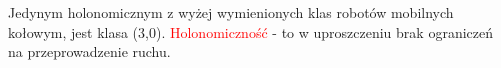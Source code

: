 	Jedynym holonomicznym z wyżej wymienionych klas robotów mobilnych kołowym, jest klasa (3,0). \newline
	\textcolor{red}{Holonomiczność} - to w uproszczeniu brak ograniczeń na przeprowadzenie ruchu.

